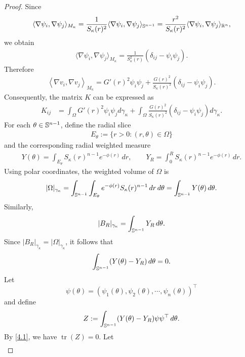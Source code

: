 \documentclass[11pt,leqno]{amsart}
\def\k{\kappa}
\def\S{\Bbb S}
\def\R{\mathbb{R}}
\def\Sph{\Bbb S}
\def\k{\kappa}
\def\tr{\operatorname{tr}}
\def\tr{\operatorname{tr}}
\numberwithin{equation}{section}
\begin{document}
\begin{proof}
Since
$$
\langle \nabla \psi_i,\nabla \psi_j\rangle_{M_\k}=\frac{1}{S_\k(r)^2}\langle \nabla \psi_i,\nabla \psi_j\rangle_{{\S^{n-1}}}=\frac{r^2}{S_\k(r)^2}\langle \nabla \psi_i,\nabla \psi_j\rangle_{{\R^{n}}},
$$
we obtain
\begin{align*}
\langle \nabla \psi_i,\nabla \psi_j\rangle_{M_\k}=\frac{1}{S^{2}_{\k}(r)}(\delta_{ij}-\psi_i\psi_j).
\end{align*}
Therefore
\begin{align*}
    \left\langle \nabla v_{i},\nabla v_{j}\right\rangle_{M_\k}=G'(r)^{2}\psi_i\psi_j+\frac{G(r)^2}{S_{\k}(r)^2}(\delta_{ij}-\psi_i\psi_j).
\end{align*}
Consequently, the matrix $K$ can be expressed as
\begin{align}\label{4.3}
K_{ij}&=\int_{\Omega}G'(r)^{2}\psi_i\psi_jd\gamma_{\k}+\int_{\Omega}\frac{G(r)^{2}}{S_{\k}(r)^{2}}(\delta_{ij}-\psi_i\psi_j)d\gamma_{\k}.
\end{align}
For each $\theta\in\Sph^{n-1}$, define the radial slice
\begin{align*}
        E_\theta:=\{r>0:(r, \theta)\in\Omega\}
\end{align*}
and the corresponding radial weighted measure
\begin{align*}
        Y(\theta)=\int_{E_\theta}S_{\k}(r)^{n-1}e^{-\phi(r)}\,dr,
        \qquad
        Y_R=\int_0^R S_{\k}(r)^{n-1}e^{-\phi(r)}\,dr.
\end{align*}
Using polar coordinates,  the weighted volume of 
$\Omega$ is
\begin{align*}
        |\Omega|_{\gamma_{\k}}
        =\int_{\Sph^{n-1}}\int_{E_\theta} e^{-\phi(r)}S_{\k}(r)^{n-1}\,dr\,d\theta
        =\int_{\Sph^{n-1}}Y(\theta)\,d\theta.
\end{align*}
Similarly,
\begin{align*}
        |B_R|_{\gamma_{\k}}
        =
        \int_{\Sph^{n-1}}Y_R\,d\theta.
\end{align*}
Since $|B_R|_{\gamma_{\k}}=|\Omega|_{\gamma_{\k}}$, it follows that
\begin{equation}\label{4.4}
        \int_{\Sph^{n-1}}(Y(\theta)-Y_R)\,d\theta=0.
\end{equation}
Let 
$$
\psi(\theta)=(\psi_1(\theta), \psi_2(\theta), \cdots, \psi_n(\theta))^\top
$$
and 
define 
\begin{align*}
        Z:=\int_{\Sph^{n-1}}(Y(\theta)-Y_R)\psi \psi^\top \,d\theta.
\end{align*}
By  \eqref{4.1}, we have $\tr (Z)=0$. 
Let
\begin{align*}

\end{align*}
\end{proof}
\end{document}
